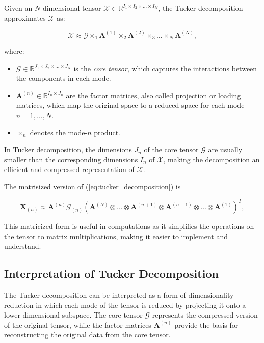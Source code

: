 \documentclass[a4paper,14pt]{article}
\theoremstyle{plain} %
\theoremstyle{definition} %
\theoremstyle{remark} %
\theoremstyle{definition}
\theoremstyle{remark}
\theoremstyle{remark}
\begin{document}
	Given an \( N \)-dimensional tensor \( \mathcal{X} \in \mathbb{R}^{I_1 \times I_2 \times \dots \times I_N} \), the Tucker decomposition approximates \( \mathcal{X} \) as:
	
	\begin{equation}
		\mathcal{X} \approx \mathcal{G} \times_1 \mathbf{A}^{(1)} \times_2 \mathbf{A}^{(2)} \times_3 \dots \times_N \mathbf{A}^{(N)},
		\label{eq:tucker_decomposition}
	\end{equation}
	
	where:
	\begin{itemize}
		\item \( \mathcal{G} \in \mathbb{R}^{J_1 \times J_2 \times \dots \times J_N} \) is the \textit{core tensor}, which captures the interactions between the components in each mode.
		\item \( \mathbf{A}^{(n)} \in \mathbb{R}^{I_n \times J_n} \) are the factor matrices, also called projection or loading matrices, which map the original space to a reduced space for each mode \( n = 1, \dots, N \).
		\item \( \times_n \) denotes the mode-\( n \) product.
	\end{itemize}
	
	In Tucker decomposition, the dimensions \( J_n \) of the core tensor \( \mathcal{G} \) are usually smaller than the corresponding dimensions \( I_n \) of \( \mathcal{X} \), making the decomposition an efficient and compressed representation of \( \mathcal{X} \).
	
	The matrisized version of (\ref{eq:tucker_decomposition}) is
	
	\[
	\mathbf{X}_{(n)} \approx \mathbf{A}^{(n)} \mathcal{G}_{(n)} \left( \mathbf{A}^{(N)} \otimes \dots \otimes \mathbf{A}^{(n+1)} \otimes \mathbf{A}^{(n-1)} \otimes \dots \otimes \mathbf{A}^{(1)} \right)^T,
	\]
	
	This matricized form is useful in computations as it simplifies the operations on the tensor to matrix multiplications, making it easier to implement and understand.
	
	\subsection{Interpretation of Tucker Decomposition}
	
	The Tucker decomposition can be interpreted as a form of dimensionality reduction in which each mode of the tensor is reduced by projecting it onto a lower-dimensional subspace. The core tensor \( \mathcal{G} \) represents the compressed version of the original tensor, while the factor matrices \( \mathbf{A}^{(n)} \) provide the basis for reconstructing the original data from the core tensor.
	
\end{document}
